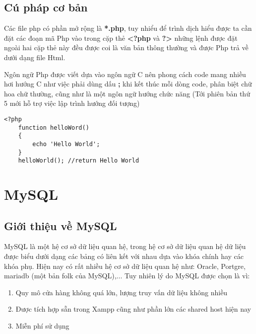 \subsection{Cú pháp cơ bản}
Các file php có phần mở rộng là \textbf{*.php}, tuy nhiểu để trình dịch hiểu được ta cần đặt các đoạn mã Php vào trong cặp thẻ \textbf{<?php} và \textbf{?>} những lệnh được đặt ngoài hai cặp thẻ này đều được coi là văn bản thông thường và được Php trả về dưới dạng file Html.\par
Ngôn ngữ Php được viết dựa vào ngôn ngữ C nên phong cách code mang nhiều hơi hướng C như việc phải dùng dấu \textbf{;} khi kết thúc mỗi dòng code, phân biệt chữ hoa chữ thường, cũng như là một ngôn ngữ hướng chức năng (Tới phiên bản thứ 5 mới hỗ trợ việc lập trình hướng đối tượng)
\lstset{language=Php}
\begin{center}
\vspace{-2em}
\begin{lstlisting}[frame=single]
<?php
    function helloWord()
    {
        echo 'Hello World';
    }
    helloWorld(); //return Hello World
\end{lstlisting}
\end{center}
\section{MySQL}
\subsection{Giới thiệu về MySQL}
MySQL là một hệ cơ sở dữ liệu quan hệ, trong hệ cơ sở dữ liệu quan hệ dữ liệu được biểu dưới dạng các bảng có liên kết với nhau dựa vào khóa chính hay các khóa phụ. Hiện nay có rất nhiều hệ cơ sở dữ liệu quan hệ như: Oracle, Portgre, mariadb (một bản folk của MySQL),... Tuy nhiên lý do MySQL được chọn là vì:
\begin{enumerate}
\vspace{-1em}
\itemsep0em
\item Quy mô cửa hàng không quá lớn, lượng truy vấn dữ liệu không nhiều
\item Được tích hợp sẵn trong Xampp cũng như phần lớn các shared host hiện nay
\item Miễn phí sử dụng
\end{enumerate}
